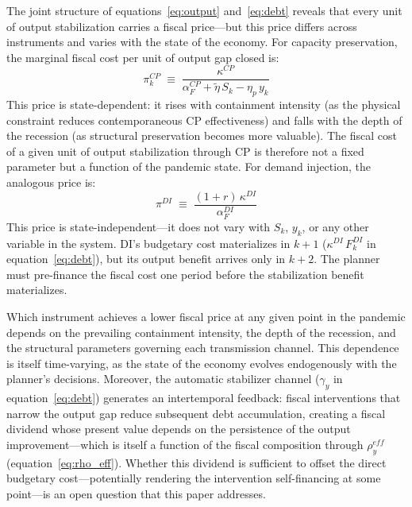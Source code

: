 The joint structure of equations~\eqref{eq:output} and~\eqref{eq:debt} reveals that every unit of output stabilization carries a fiscal price---but this price differs across instruments and varies with the state of the economy. For capacity preservation, the marginal fiscal cost per unit of output gap closed is:
%
\begin{equation}
    \pi^{CP}_k \;\equiv\; 
    \frac{\kappa^{CP}}{\alpha^{CP}_F + \tilde{\eta}\,S_k - \eta_p\,y_k}
    \label{eq:price_CP}
\end{equation}
%
This price is state-dependent: it rises with containment intensity (as the physical constraint reduces contemporaneous CP effectiveness) and falls with the depth of the recession (as structural preservation becomes more valuable). The fiscal cost of a given unit of output stabilization 
through CP is therefore not a fixed parameter but a function of 
the pandemic state. For demand injection, the analogous price is:
%
\begin{equation}
    \pi^{DI} \;\equiv\; 
    \frac{(1+r)\,\kappa^{DI}}{\alpha^{DI}_F}
    \label{eq:price_DI}
\end{equation}
%
This price is state-independent---it does not vary with $S_k$, $y_k$, 
or any other variable in the system. DI's budgetary cost materializes 
in $k+1$ ($\kappa^{DI}\,F^{DI}_k$ in equation~\ref{eq:debt}), but its 
output benefit arrives only in $k+2$. The planner must pre-finance the fiscal cost one period before the stabilization benefit materializes.

Which instrument achieves a lower fiscal price at any given point 
in the pandemic depends on the prevailing containment intensity, 
the depth of the recession, and the structural parameters governing 
each transmission channel. This dependence is itself time-varying, 
as the state of the economy evolves endogenously with the planner's 
decisions. Moreover, the automatic stabilizer channel ($\gamma_y$ 
in equation~\ref{eq:debt}) generates an intertemporal feedback: 
fiscal interventions that narrow the output gap reduce subsequent 
debt accumulation, creating a fiscal dividend whose present value 
depends on the persistence of the output improvement---which is 
itself a function of the fiscal composition through $\rho^{eff}_y$ 
(equation~\ref{eq:rho_eff}). Whether this dividend is sufficient 
to offset the direct budgetary cost---potentially rendering the 
intervention self-financing at some point---is an open question that this paper addresses.

